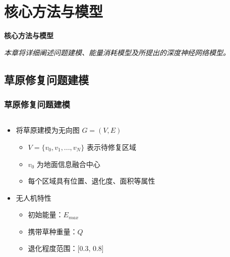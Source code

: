 \documentclass[11pt, aspectratio=169]{beamer}  %
\begin{document}
\section{核心方法与模型}
\begin{frame}
	\centering %
	{\Huge \sffamily\bfseries\textcolor{njupt}{核心方法与模型}}
	\par %
	\vspace{0.5cm} %
	{\large \itshape{本章将详细阐述问题建模、能量消耗模型及所提出的深度神经网络模型。}} %
\end{frame}

\subsection{草原修复问题建模}
\begin{frame}
	\frametitle{草原修复问题建模}
	\begin{columns}
		\begin{column}{0.4\textwidth}
			\small %
			\begin{itemize}
				\item 将草原建模为无向图 $G = (V, E)$
				      \begin{itemize}
					      \item $V = \{v_0, v_1, ..., v_N \}$ 表示待修复区域
					      \item $v_0$ 为地面信息融合中心
					      \item 每个区域具有位置、退化度、面积等属性
				      \end{itemize}
				\item 无人机特性
				      \begin{itemize}
					      \item 初始能量：$E_{max}$
					      \item 携带草种重量：$Q$
					      \item 退化程度范围：[0.3, 0.8]
				      \end{itemize}
			\end{itemize}
		\end{column}
		\begin{column}{0.6\textwidth}
			\centering
			
		\end{column}
	\end{columns}
\end{frame}
\end{document}
